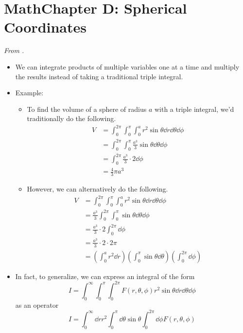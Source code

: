\documentclass[../notes.tex]{subfiles}
\begin{document}
\section{MathChapter D: Spherical Coordinates}
\emph{From \textcite{bib:McQuarrieSimon}.}
\begin{itemize}
    \item We can integrate products of multiple variables one at a time and multiply the results instead of taking a traditional triple integral.
    \item Example:
    \begin{itemize}
        \item To find the volume of a sphere of radius $a$ with a triple integral, we'd traditionally do the following.
        \begin{align*}
            V &= \int_0^{2\pi}\int_0^\pi\int_0^ar^2\sin\theta\dd{r}\dd{\theta}\dd{\phi}\\
            &= \int_0^{2\pi}\int_0^\pi\frac{a^3}{3}\sin\theta\dd{\theta}\dd{\phi}\\
            &= \int_0^{2\pi}\frac{a^3}{3}\cdot 2\dd{\phi}\\
            &= \frac{4}{3}\pi a^3
        \end{align*}
        \item However, we can alternatively do the following.
        \begin{align*}
            V &= \int_0^{2\pi}\int_0^\pi\int_0^ar^2\sin\theta\dd{r}\dd{\theta}\dd{\phi}\\
            &= \frac{a^3}{3}\int_0^{2\pi}\int_0^\pi\sin\theta\dd{\theta}\dd{\phi}\\
            &= \frac{a^3}{3}\cdot 2\int_0^{2\pi}\dd{\phi}\\
            &= \frac{a^3}{3}\cdot 2\cdot 2\pi\\
            &= \left( \int_0^ar^2\dd{r} \right)\left( \int_0^\pi\sin\theta\dd{\theta} \right)\left( \int_0^{2\pi}\dd{\phi} \right)
        \end{align*}
    \end{itemize}
    \item In fact, to generalize, we can express an integral of the form
    \begin{equation*}
        I = \int_0^\infty\int_0^\pi\int_0^{2\pi}F(r,\theta,\phi)r^2\sin\theta\dd{r}\dd{\theta}\dd{\phi}
    \end{equation*}
    as an operator
    \begin{equation*}
        I = \int_0^\infty\dd{r}r^2\int_0^\pi\dd{\theta}\sin\theta\int_0^{2\pi}\dd{\phi}F(r,\theta,\phi)

\end{equation*}
\end{itemize}
\end{document}
